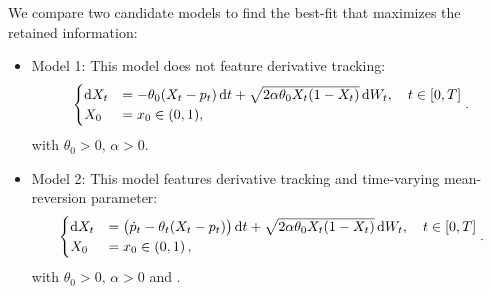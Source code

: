 \documentclass[11pt]{article}
\theoremstyle{definition}
\begin{document}
We compare two candidate models to find the best-fit that maximizes the retained information:
\begin{itemize}
  \item Model 1: This model does not feature derivative tracking:
\begin{equation}
\begin{cases}
\dif X_t&=-\theta_0 (X_t - p_t) \dif t +\sqrt{2 \alpha \theta_0 X_t (1 - X_t)} \dif W_t, \quad t \in [0,T]  \\
X_0&=x_0\in (0,1),
\end{cases}.  \label{Model1}
\end{equation}
 with $\theta_0 > 0, \, \alpha > 0$.

%  

  \item Model 2: This model features derivative tracking and time-varying mean-reversion parameter:  
\begin{equation}
\begin{cases}
\dif X_t&= \big(\dot{p}_t  - \theta_t (X_t - p_t) \big) \dif t +\sqrt{2 \alpha \theta_0 X_t (1 - X_t)} \dif W_t, \quad t \in [0,T]\\
X_0&=x_0\in (0,1) \,,
\end{cases}.  \label{Model2}
\end{equation}
 with $\theta_0 > 0, \, \alpha > 0$ and .
\end{itemize}
\end{document}
